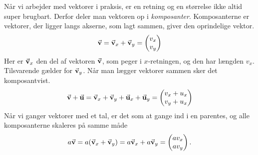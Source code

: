 Når vi arbejder med vektorer i praksis, er en retning og en størrelse ikke altid super brugbart.
Derfor deler man vektoren op i \emph{komposanter}. 
Komposanterne er vektorer, der ligger langs akserne, som lagt sammen, giver den oprindelige vektor.
%
\begin{align}
    \va v = \va v_x + \va v_y = \begin{pmatrix}
    v_x \\ v_y
    \end{pmatrix}
\end{align}
%
Her er $\va{v}_x$ den del af vektoren $\va{v}$, som peger i $x$-retningen, og den har længden $v_x$. Tilsvarende gælder for $\va{v}_y$. Når man lægger vektorer sammen sker det komposantvist.
%
\begin{align}
    \va v+\va u=\va v_x+\va v_y+\va u_x+\va u_y= \begin{pmatrix}
    v_x+u_x \\ v_y+u_x
    \end{pmatrix}
\end{align}
%
Når vi ganger vektorer med et tal, er det som at gange ind i en parentes, og alle komposanterne skaleres på samme måde
%
\begin{align}
    a\va v=a(\va v_x+\va v_y)=a\va v_x+a\va v_y= \begin{pmatrix}
    av_x \\ av_y
    \end{pmatrix}.
\end{align}

